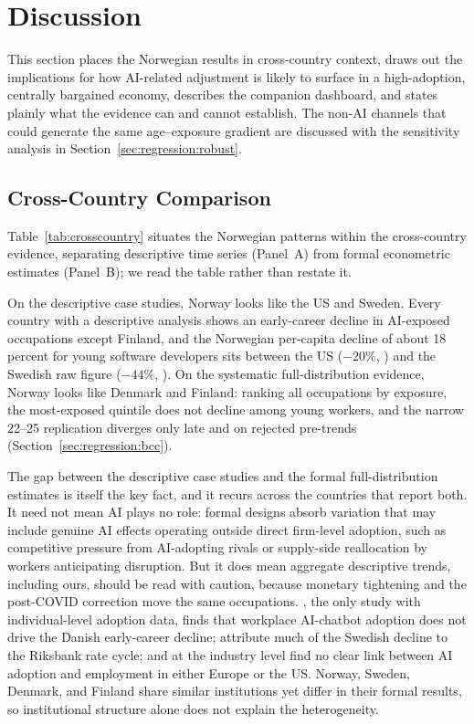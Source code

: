 \documentclass[12pt]{article}
\begin{document}
\section{Discussion}\label{sec:discussion}

This section places the Norwegian results in cross-country context, draws out the implications for how AI-related adjustment is likely to surface in a high-adoption, centrally bargained economy, describes the companion dashboard, and states plainly what the evidence can and cannot establish. The non-AI channels that could generate the same age--exposure gradient are discussed with the sensitivity analysis in Section~\ref{sec:regression:robust}.

\subsection{Cross-Country Comparison}\label{sec:discussion:crosscountry}

Table~\ref{tab:crosscountry} situates the Norwegian patterns within the cross-country evidence, separating descriptive time series (Panel~A) from formal econometric estimates (Panel~B); we read the table rather than restate it.

On the descriptive case studies, Norway looks like the US and Sweden. Every country with a descriptive analysis shows an early-career decline in AI-exposed occupations except Finland, and the Norwegian per-capita decline of about 18 percent for young software developers sits between the US ($-20\%$, \citealp{brynjolfsson2025}) and the Swedish raw figure ($-44\%$, \citealp{lodefalk2026}). On the systematic full-distribution evidence, Norway looks like Denmark and Finland: ranking all occupations by exposure, the most-exposed quintile does not decline among young workers, and the narrow 22--25 replication diverges only late and on rejected pre-trends (Section~\ref{sec:regression:bcc}).

The gap between the descriptive case studies and the formal full-distribution estimates is itself the key fact, and it recurs across the countries that report both. It need not mean AI plays no role: formal designs absorb variation that may include genuine AI effects operating outside direct firm-level adoption, such as competitive pressure from AI-adopting rivals or supply-side reallocation by workers anticipating disruption. But it does mean aggregate descriptive trends, including ours, should be read with caution, because monetary tightening and the post-COVID correction move the same occupations. \citet{humlum2026}, the only study with individual-level adoption data, finds that workplace AI-chatbot adoption does not drive the Danish early-career decline; \citet{lodefalk2026} attribute much of the Swedish decline to the Riksbank rate cycle; and at the industry level \citet{bick2026} find no clear link between AI adoption and employment in either Europe or the US. Norway, Sweden, Denmark, and Finland share similar institutions yet differ in their formal results, so institutional structure alone does not explain the heterogeneity.
\end{document}
